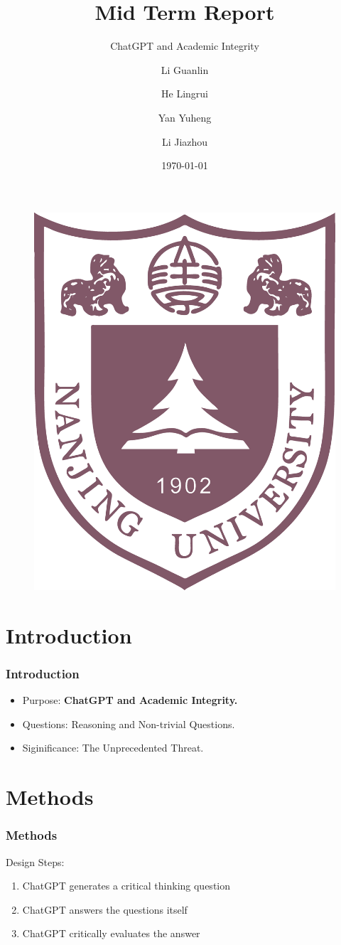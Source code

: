 \documentclass{beamer}
\title[Reflection on ChatGPT]
{Mid Term Report}
\subtitle{ChatGPT and Academic Integrity}
\author[Eric] %
{Li Guanlin\inst{1} \and He Lingrui\inst{1} \and Yan Yuheng \inst{1} \and Li Jiazhou \inst{1}}
\institute[NJU] %
{
\inst{1}%
Undergraduates in ICS\\
Nanjing University
\and
}
\date[NJU 2023] %
{\today}
\begin{document}
\begin{frame}
    \titlepage
    \begin{figure}[htpb]
        \begin{center}
            \includegraphics[width=0.2\linewidth]{pic/NJU_Logo.eps}
        \end{center}
    \end{figure}
\end{frame}

\begin{frame}
    \tableofcontents[sectionstyle=show,subsectionstyle=show/shaded/hide,subsubsectionstyle=show/shaded/hide]
\end{frame}

\section{Introduction}

\begin{frame}
    \frametitle{Introduction}
    \Large
    \begin{itemize}
        \item Purpose: \textbf{ChatGPT and Academic Integrity.}
        \item Questions: Reasoning and Non-trivial Questions.
        \item Siginificance: \alert{The Unprecedented Threat.}%
    \end{itemize}
\end{frame}

\section{Methods}

\begin{frame}
    \frametitle{Methods}
    \Large
    \begin{block}{Design}
        Steps:

        \begin{enumerate}
            \item<1-> ChatGPT generates a critical thinking question
            \item<2-> ChatGPT answers the questions itself
            \item<3-> ChatGPT critically evaluates the answer
        \end{enumerate}
    \end{block}
\end{frame}
\end{document}
